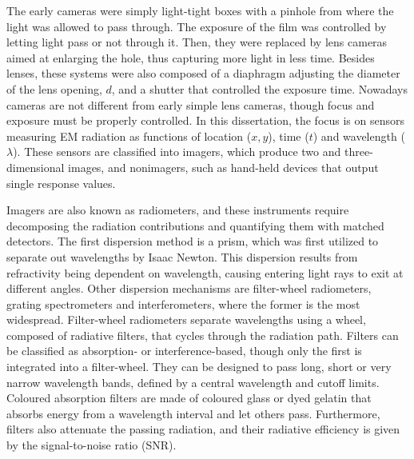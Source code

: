 The early cameras were simply light-tight boxes with a pinhole from where the light was allowed to pass through. The exposure of the film was controlled by letting light pass or not through it. Then, they were replaced by lens cameras aimed at enlarging the hole, thus capturing more light in less time. Besides lenses, these systems were also composed of a diaphragm adjusting the diameter of the lens opening, $d$, and a shutter that controlled the exposure time. Nowadays cameras are not different from early simple lens cameras, though focus and exposure must be properly controlled. In this dissertation, the focus is on sensors measuring EM radiation as functions of location ($x, y$), time ($t$) and wavelength ($\lambda$). These sensors are classified into imagers, which produce two and three-dimensional images, and nonimagers, such as hand-held devices that output single response values. 

Imagers are also known as radiometers, and these instruments require decomposing the radiation contributions and quantifying them with matched detectors. The first dispersion method is a prism, which was first utilized to separate out wavelengths by Isaac Newton. This dispersion results from refractivity being dependent on wavelength, causing entering light rays to exit at different angles. Other dispersion mechanisms are filter-wheel radiometers, grating spectrometers and interferometers, where the former is the most widespread. Filter-wheel radiometers separate wavelengths using a wheel, composed of radiative filters, that cycles through the radiation path. Filters can be classified as absorption- or interference-based, though only the first is integrated into a filter-wheel. They can be designed to pass long, short or very narrow wavelength bands, defined by a central wavelength and  cutoff limits. Coloured absorption filters are made of coloured glass or dyed gelatin that absorbs energy from a wavelength interval and let others pass. Furthermore, filters also attenuate the passing radiation, and their radiative efficiency is given by the signal-to-noise ratio (SNR).

